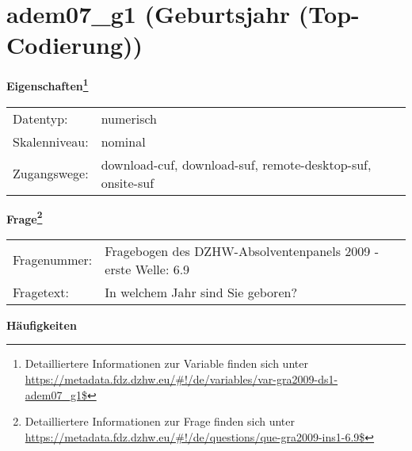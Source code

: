 
    \setcounter{footnote}{0}

    \vspace*{-1.8cm}
	\section{adem07\_g1 (Geburtsjahr (Top-Codierung))}
	\label{section:adem07_g1}



    \vspace*{0.5cm}
    \noindent\textbf{Eigenschaften\footnote{Detailliertere Informationen zur Variable finden sich unter
		\url{https://metadata.fdz.dzhw.eu/\#!/de/variables/var-gra2009-ds1-adem07_g1$}}}\\
	\begin{tabularx}{\hsize}{@{}lX}
	Datentyp: & numerisch \\
	Skalenniveau: & nominal \\
	Zugangswege: &
	  download-cuf, 
	  download-suf, 
	  remote-desktop-suf, 
	  onsite-suf
 \\
    \end{tabularx}



				\vspace*{0.5cm}
                \noindent\textbf{Frage\footnote{Detailliertere Informationen zur Frage finden sich unter
		              \url{https://metadata.fdz.dzhw.eu/\#!/de/questions/que-gra2009-ins1-6.9$}}}\\
				\begin{tabularx}{\hsize}{@{}lX}
					Fragenummer: &
					  Fragebogen des DZHW-Absolventenpanels 2009 - erste Welle:
					  6.9
 \\
					Fragetext: & In welchem Jahr sind Sie geboren? \\
				\end{tabularx}





        		\vspace*{0.5cm}
                \noindent\textbf{Häufigkeiten}

